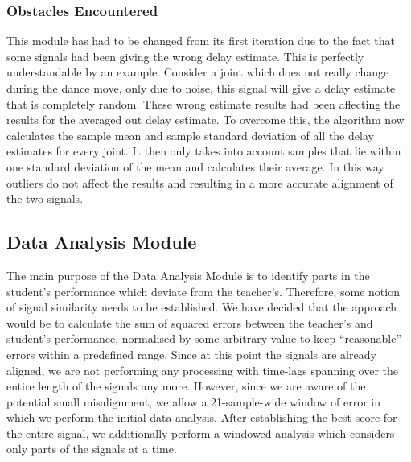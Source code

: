\documentclass[11pt,a4paper]{article}
\begin{document}
\subsubsection{Obstacles Encountered}
\noindent
This module has had to be changed from its first iteration due to the fact that some signals had been giving the wrong delay estimate. This is perfectly understandable by an example. Consider a joint which does not really change during the dance move, only due to noise, this signal will give a delay estimate that is completely random. These wrong estimate results had been affecting the results for the averaged out delay estimate. To overcome this, the algorithm now calculates the sample mean and sample standard deviation of all the delay estimates for every joint. It then only takes into account samples that lie within one standard deviation of the mean and calculates their average. In this way outliers do not affect the results and resulting in a more accurate alignment of the two signals.  

\subsection{Data Analysis Module}
\noindent
The main purpose of the Data Analysis Module is to identify parts in the student's performance which deviate from the teacher's. Therefore, some notion of signal similarity needs to be established. We have decided that the approach would be to calculate the sum of squared errors  between the teacher's and student's performance, normalised by some arbitrary value to keep ``reasonable'' errors within a predefined range. Since at this point the signals are already aligned, we are not performing any processing with time-lags spanning over the entire length of the signals any more. However, since we are aware of the potential small misalignment, we allow a 21-sample-wide window of error in which we perform the initial data analysis. After establishing the best score for the entire signal, we additionally perform a windowed analysis which considers only parts of the signals at a time.
\end{document}
